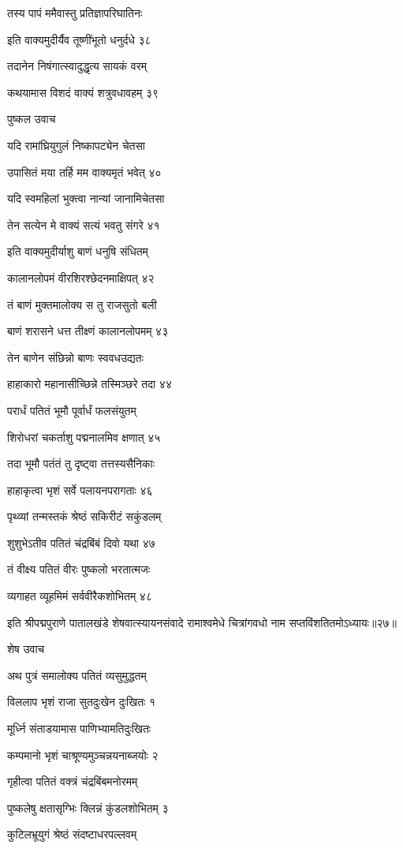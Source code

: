तस्य पापं ममैवास्तु प्रतिज्ञापरिघातिनः

इति वाक्यमुदीर्यैव तूष्णींभूतो धनुर्दधे ३८

तदानेन निषंगात्स्वादुद्धृत्य सायकं वरम्

कथयामास विशदं वाक्यं शत्रुवधावहम् ३९

पुष्कल उवाच

यदि रामांघ्रियुगुलं निष्कापट्येन चेतसा

उपासितं मया तर्हि मम वाक्यमृतं भवेत् ४०

यदि स्वमहिलां भुक्त्वा नान्यां जानामिचेतसा

तेन सत्येन मे वाक्यं सत्यं भवतु संगरे ४१

इति वाक्यमुदीर्याशु बाणं धनुषि संधितम्

कालानलोपमं वीरशिरश्छेदनमाक्षिपत् ४२

तं बाणं मुक्तमालोक्य स तु राजसुतो बली

बाणं शरासने धत्त तीक्ष्णं कालानलोपमम् ४३

तेन बाणेन संछिन्नो बाणः स्ववधउद्यतः

हाहाकारो महानासीच्छिन्ने तस्मिञ्छरे तदा ४४

परार्धं पतितं भूमौ पूर्वार्धं फलसंयुतम्

शिरोधरां चकर्ताशु पद्मनालमिव क्षणात् ४५

तदा भूमौ पतंतं तु दृष्ट्वा तत्तस्यसैनिकाः

हाहाकृत्वा भृशं सर्वे पलायनपरागताः ४६

पृथ्व्यां तन्मस्तकं श्रेष्ठं सकिरीटं सकुंडलम्

शुशुभेऽतीव पतितं चंद्रबिंबं दिवो यथा ४७

तं वीक्ष्य पतितं वीरः पुष्कलो भरतात्मजः

व्यगाहत व्यूहमिमं सर्ववीरैकशोभितम् ४८

इति श्रीपद्मपुराणे पातालखंडे शेषवात्स्यायनसंवादे रामाश्वमेधे चित्रांगवधो नाम सप्तविंशतितमोऽध्यायः॥२७॥


शेष उवाच

अथ पुत्रं समालोक्य पतितं व्यसुमुद्धतम्

विललाप भृशं राजा सुतदुःखेन दुःखितः १

मूर्ध्नि संताडयामास पाणिभ्यामतिदुःखितः

कम्पमानो भृशं चाश्रूण्यमुञ्चन्नयनाब्जयोः २

गृहीत्वा पतितं वक्त्रं चंद्रबिंबमनोरमम्

पुष्कलेषु क्षतासृग्भिः क्लिन्नं कुंडलशोभितम् ३

कुटिलभ्रूयुगं श्रेष्ठं संदष्टाधरपल्लवम्

